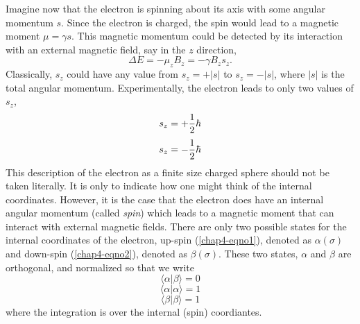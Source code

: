 Imagine now that the electron is spinning about its axis with some angular
momentum $s$. Since the electron is charged, the spin would lead to a 
magnetic moment $\mu = \gamma s$. This magnetic momentum could be detected 
by its interaction with an external magnetic field, say in the $z$ 
direction,
\begin{equation}
\Delta E = - \mu_z B_z = - \gamma B_z s_z .
\end{equation}
Classically, $s_z$ could have any value from $s_z = +|s|$ to $s_z = - 
|s|$, where $|s|$ is the total angular
momentum.  Experimentally, the electron leads to only two values of $s_z$,
\begin{equation}
s_z = + {1 \over 2} \hbar
\label{chap4-eqno1}
\end{equation}
\begin{equation}
s_z = - {1 \over 2} \hbar
\label{chap4-eqno2}
\end{equation}
This description of the electron as a finite size charged sphere
should not be taken literally.  It is only to indicate how one might
think of the internal coordinates.  However, it is the case that the
electron does have an internal angular momentum (called \emph{spin})
which leads to a magnetic moment that can interact with external
magnetic fields. There are only two possible states for the internal
coordinates of the electron, up-spin (\ref{chap4-eqno1}), denoted as
$\alpha ( \sigma )$ and down-spin (\ref{chap4-eqno2}), denoted as
$\beta ( \sigma )$.  These two states, $\alpha$ and $\beta$ are
orthogonal, and normalized so that we write
\begin{equation}
\langle \alpha | \beta \rangle = 0
\end{equation}
\begin{equation}
\langle \alpha | \alpha \rangle = 1
\end{equation}
\begin{equation}
\langle \beta | \beta \rangle = 1
\end{equation}
where the integration is over the internal (spin) coordiantes.


